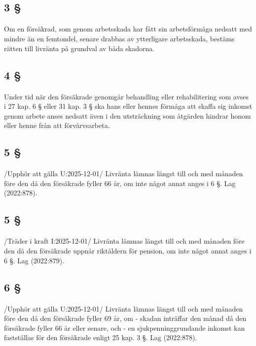 \documentclass[a4paper,notitlepage,openany,10pt]{book}
\begin{document}
\subsection*{3 §}
\paragraph*{}
Om en försäkrad, som genom arbetsskada har fått sin arbetsförmåga nedsatt med mindre än en femtondel, senare drabbas av ytterligare arbetsskada, bestäms rätten till livränta på grundval av båda skadorna.
\subsection*{4 §}
\paragraph*{}
Under tid när den försäkrade genomgår behandling eller rehabilitering som avses i 27 kap. 6 § eller 31 kap. 3 § ska hans eller hennes förmåga att skaffa sig inkomst genom arbete anses nedsatt även i den utsträckning som åtgärden hindrar honom eller henne från att förvärvsarbeta.
\subsection*{5 §}
\paragraph*{}
/Upphör att gälla U:2025-12-01/
Livränta lämnas längst till och med månaden före den då den försäkrade fyller 66 år, om inte något annat anges i 6 §.
Lag (2022:878).
\subsection*{5 §}
\paragraph*{}
/Träder i kraft I:2025-12-01/
Livränta lämnas längst till och med månaden före den då den försäkrade uppnår riktåldern för pension, om inte något annat anges i 6 §.
Lag (2022:879).
\subsection*{6 §}
\paragraph*{}
/Upphör att gälla U:2025-12-01/
Livränta lämnas längst till och med månaden före den då den försäkrade fyller 69 år, om
\newline - skadan inträffar den månad då den försäkrade fyller 66 år eller senare, och
\newline - en sjukpenninggrundande inkomst kan fastställas för den försäkrade enligt 25 kap. 3 §.
Lag (2022:878).
\end{document}
